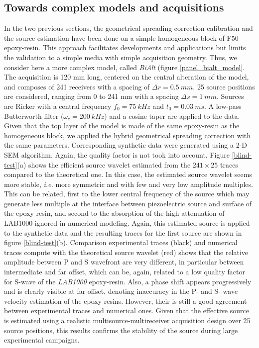 \documentclass[manuscript,revised]{geophysics}
\newcommand{\twod}{2-D }
\newcommand{\bialt}{\textit{BiAlt} }
\begin{document}
\subsection{Towards complex models and acquisitions}

\noindent In the two previous sections, the geometrical spreading correction calibration and the source estimation have been done on a simple homogeneous block of F50 epoxy-resin. This approach facilitates developments and applications but limits the validation to a simple media with simple acquisition geometry. Thus, we consider here a more complex model, called \bialt (figure \ref{panel_bialt_model}. The acquisition is 120 mm long, centered on the central alteration of the model, and composes of 241 receivers with a spacing of $\Delta r=0.5\ mm$. 25 source positions are considered, ranging from 0 to 241 mm with a spacing $\Delta s=1\ mm$. Sources are Ricker with a central frequency $f_{0}=75\ kHz$ and $t_{0}=0.03\ ms$. A low-pass Butterworth filter ($\omega_{c}=200\ kHz$) and a cosine taper are applied to the data. Given that the top layer of the model is made of the same epoxy-resin as the homogeneous block, we applied the hybrid geometrical spreading correction with the same parameters. Corresponding synthetic data were generated using a \twod  SEM algorithm. Again, the quality factor is not took into account. Figure \ref{blind-test}(a) shows the efficient source wavelet estimated from the $241 \times 25$ traces compared to the theoretical one. In this case, the estimated source wavelet seems more stable, \textit{i.e.} more symmetric and with few and very low amplitude multiples. This can be related, first to the lower central frequency of the source which may generate less multiple at the interface between piezoelectric source and surface of the epoxy-resin, and second to the absorption of the high attenuation of LAB1000 ignored in numerical modeling. Again, this estimated source is applied to the synthetic data and the resulting traces  for the first source are shown in figure \ref{blind-test}(b). Comparison experimental traces (black) and numerical traces compute with the theoretical source wavelet (red) shows that the relative amplitude between P and S wavefront are very different, in particular between intermediate and far offset, which can be, again, related to a low quality factor for S-wave of the \textit{LAB1000} epoxy-resin. Also, a phase shift appears progressively and is clearly visible at far offset, denoting inaccuracy in the P- and S- wave velocity estimation of the epoxy-resins. However, their is still a good agreement between experimental traces and numerical ones. Given that the effective source is estimated using a realistic multisource-multireceiver acquisition design over 25 source positions, this results confirms the stability of the source during large experimental campaigns.     
\end{document}
